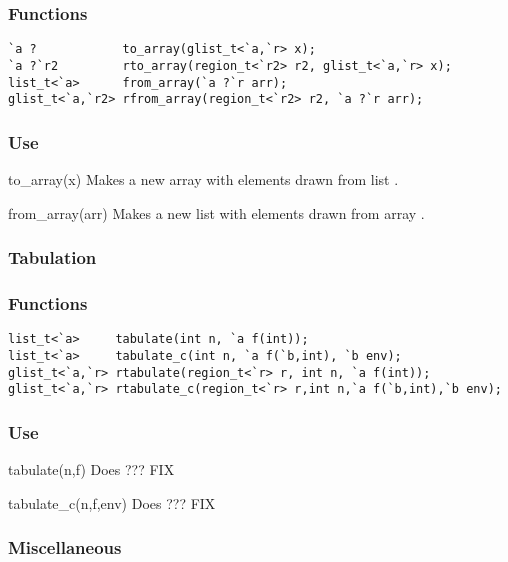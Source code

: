 \subsubsection*{Functions}
\begin{verbatim}
`a ?            to_array(glist_t<`a,`r> x);
`a ?`r2         rto_array(region_t<`r2> r2, glist_t<`a,`r> x);
list_t<`a>      from_array(`a ?`r arr);
glist_t<`a,`r2> rfrom_array(region_t<`r2> r2, `a ?`r arr);
\end{verbatim}

\subsubsection*{Use}

\begin{defun}{to_array}{(x)}
Makes a new array with elements drawn from list .
\end{defun}

\begin{defun}{from_array}{(arr)}
Makes a new list with elements drawn from array .
\end{defun}

\subsubsection*{Tabulation}
\subsubsection*{Functions}
\begin{verbatim}
list_t<`a>     tabulate(int n, `a f(int));
list_t<`a>     tabulate_c(int n, `a f(`b,int), `b env);
glist_t<`a,`r> rtabulate(region_t<`r> r, int n, `a f(int));
glist_t<`a,`r> rtabulate_c(region_t<`r> r,int n,`a f(`b,int),`b env);
\end{verbatim}

\subsubsection*{Use}

\begin{defun}{tabulate}{(n,f)}
Does ??? FIX
\end{defun}

\begin{defun}{tabulate_c}{(n,f,env)}
Does ??? FIX
\end{defun}

\subsubsection*{Miscellaneous}
